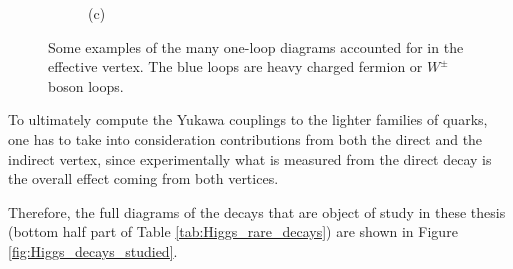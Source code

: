 \begin{figure}[!ht]
\begin{subfigure}[t]{0.333\mylength}
            \caption{\footnotesize (c)}
    \end{subfigure}%
    \caption{Some examples of the many one-loop diagrams accounted for in the effective vertex. The blue loops are heavy charged fermion or $W^{\pm}$ boson loops.}
    \label{fig:Higgs_decays_indirect}
    \vspace*{-0.0cm}
\end{figure}

To ultimately compute the Yukawa couplings to the lighter families of quarks, one has to take into consideration contributions from both the direct and the indirect vertex, since experimentally what is measured from the direct decay is the overall effect coming from both vertices.

Therefore, the full diagrams of the decays that are object of study in these thesis (bottom half part of Table \ref{tab:Higgs_rare_decays}) are shown in Figure \ref{fig:Higgs_decays_studied}.

